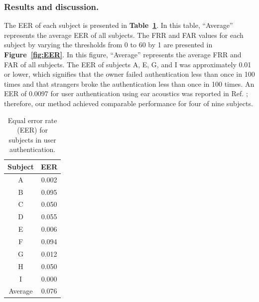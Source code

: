 \documentclass[sigchi,authordraft]{acmart}
\newcommand\figref[1]{\textbf{Figure~\ref{fig:#1}}}
\newcommand\tabref[1]{\textbf{Table~\ref{tab:#1}}}
\begin{document}
\subsubsection{Results and discussion.}
The EER of each subject is presented in \tabref{EER_num}. In this table, ``Average'' represents the average EER of all subjects. The FRR and FAR values for each subject by varying the thresholds from 0 to 60 by 1 are presented in \figref{EER}. In this figure, ``Average'' represents the average FRR and FAR of all subjects. The EER of subjects A, E, G, and I was approximately 0.01 or lower, which signifies that the owner failed authentication less than once in 100 times and that strangers broke the authentication less than once in 100 times. An EER of 0.0097 for user authentication using ear acoustics was reported in Ref. \cite{ear_auth}; therefore, our method achieved comparable performance for four of nine subjects.\par

\begin{table}[!t]
  \centering
  \caption{Equal error rate (EER) for subjects in user authentication.}
  \begin{tabular}{c|c} \hline\hline
    Subject & EER \\ \hline
    A & 0.002 \\
    B & 0.095 \\
    C & 0.050 \\
    D & 0.055 \\
    E & 0.006 \\
    F & 0.094 \\
    G & 0.012 \\
    H & 0.050 \\
    I & 0.000 \\ \hline
    Average & 0.076 \\ \hline
  \end{tabular}
  \label{tab:EER_num}
\end{table}
\end{document}
